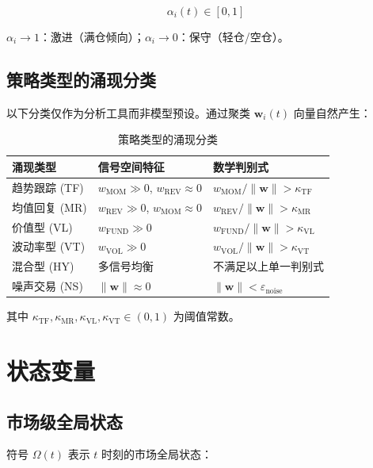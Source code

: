 \begin{equation}
\alpha_i(t) \in [0, 1]
\end{equation}

$\alpha_i \to 1$：激进（满仓倾向）；$\alpha_i \to 0$：保守（轻仓/空仓）。

\subsection{策略类型的涌现分类}

以下分类仅作为分析工具而非模型预设。通过聚类 $\mathbf{w}_i(t)$ 向量自然产生：

\begin{table}[htb]
\centering
\caption{策略类型的涌现分类}
\label{tab:strategy_types}
\begin{tabular}{@{}lll@{}}
\toprule
涌现类型 & 信号空间特征 & 数学判别式 \\
\midrule
趋势跟踪 (TF) & $w_{\text{MOM}} \gg 0$, $w_{\text{REV}} \approx 0$ & $w_{\text{MOM}} / \|\mathbf{w}\| > \kappa_{\text{TF}}$ \\
均值回复 (MR) & $w_{\text{REV}} \gg 0$, $w_{\text{MOM}} \approx 0$ & $w_{\text{REV}} / \|\mathbf{w}\| > \kappa_{\text{MR}}$ \\
价值型 (VL) & $w_{\text{FUND}} \gg 0$ & $w_{\text{FUND}} / \|\mathbf{w}\| > \kappa_{\text{VL}}$ \\
波动率型 (VT) & $w_{\text{VOL}} \gg 0$ & $w_{\text{VOL}} / \|\mathbf{w}\| > \kappa_{\text{VT}}$ \\
混合型 (HY) & 多信号均衡 & 不满足以上单一判别式 \\
噪声交易 (NS) & $\|\mathbf{w}\| \approx 0$ & $\|\mathbf{w}\| < \varepsilon_{\text{noise}}$ \\
\bottomrule
\end{tabular}
\end{table}

其中 $\kappa_{\text{TF}}, \kappa_{\text{MR}}, \kappa_{\text{VL}}, \kappa_{\text{VT}} \in (0, 1)$ 为阈值常数。

\section{状态变量}

\subsection{市场级全局状态}

符号 $\Omega(t)$ 表示 $t$ 时刻的市场全局状态：

